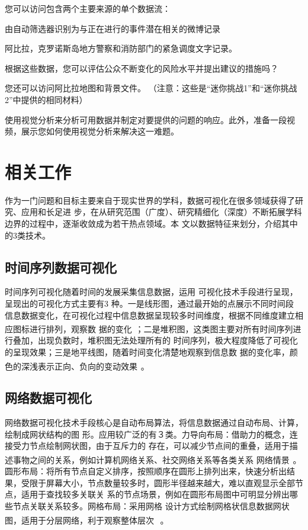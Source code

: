 \documentclass[a4paper]{article}
\begin{document}
您可以访问包含两个主要来源的单个数据流：

由自动筛选器识别为与正在进行的事件潜在相关的微博记录

阿比拉，克罗诺斯岛地方警察和消防部门的紧急调度文字记录。

根据这些数据，您可以评估公众不断变化的风险水平并提出建议的措施吗？

您还可以访问阿比拉地图和背景文件。 （注意：这些是“迷你挑战1”和“迷你挑战2”中提供的相同材料）

使用视觉分析来分析可用数据并制定对要提供的问题的响应。此外，准备一段视频，展示您如何使用视觉分析来解决这一难题。

\section{相关工作}

作为一门问题和目标主要来自于现实世界的学科，数据可视化在很多领域获得了研究、应用和长足进
步，在从研究范围（广度）、研究精细化（深度）不断拓展学科边界的过程中，逐渐收敛成为若干热点领域。本
文以数据特征来划分，介绍其中的3类技术。
\subsection{时间序列数据可视化}
时间序列可视化随着时间的发展采集信息数据，运用
可视化技术手段进行呈现，呈现出的可视化方式主要有3
种。一是线形图，通过最开始的点展示不同时间段
信息数据变化，在可视化过程中信息数据呈现较多时间维度，根据不同维度建立相应图标进行排列，观察数
据的变化\textsuperscript{~\cite{chen2018embed}}；二是堆积图，这类图主要对所有时间序列进行叠加，出现负数时，堆积图无法处理所有的
时间序列，极大程度降低了可视化的呈现效果；三是地平线图，随着时间变化清楚地观察到信息数
据的变化率，颜色的深浅表示正向、负向的变动效果\textsuperscript{~\cite{ali2019timecluster,suh2019persistent}}。
\subsection{网络数据可视化}
网络数据可视化技术手段核心是自动布局算法，将信息数据通过自动布局、计算，绘制成网状结构的图
形。应用较广泛的有３类。力导向布局：借助力的概念，连接受力节点绘制网状图，由于互斥力的
存在，可以减少节点间的重叠，适用于描述事物之间的关系，例如计算机网络关系、社交网络关系等各类关系
网络情景\textsuperscript{~\cite{韩刘2020多元异构网络复杂多维数据可视化方法,王悦2020可视化指导下的图像领域深度学习模型优化方案设计}}。圆形布局：将所有节点自定义排序，按照顺序在圆形上排列出来，快速分析出结
果，受限于屏幕大小，节点数量较多时，圆形半径越来越大，难以直观显示全部节点，适用于查找较多关联关
系的节点场景，例如在圆形布局图中可明显分辨出哪些节点关联关系较多。网格布局：采用网格
设计方式绘制网格状信息数据网状图，适用于分层网络，利于观察整体层次
\textsuperscript{~\cite{田丰2019自然人机交互新进展专题前言}}。
\end{document}
